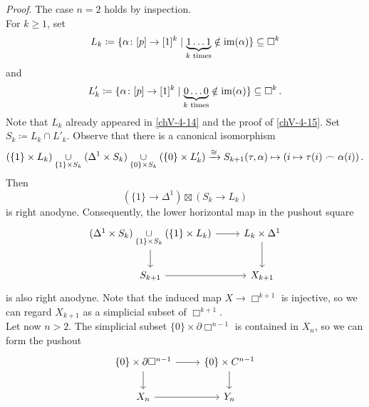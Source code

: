         \emph{Proof}. The case $n = 2$ holds by inspection.\\
        For $k \geq 1$, set
        \begin{equation*}
            L_k \coloneq \{ \alpha \colon [p] \to [1]^k \mid \underbrace{1 \ldots 1}_{k \text{ times}} \notin \operatorname{im}(\alpha)\} \subseteq \Box^k
        \end{equation*}
        and
        \begin{equation*}
            L'_k \coloneq \{ \alpha \colon [p] \to [1]^k \mid \underbrace{0 \ldots 0}_{k \text{ times}} \notin \operatorname{im}(\alpha)\} \subseteq \Box^k \,.
        \end{equation*}
        Note that $L_k$ already appeared in \ref{chV-4-14} and the proof of \ref{chV-4-15}. Set $S_k \coloneq L_k \cap L'_k$. Observe that there is a canonical isomorphism
        \begin{equation*}
            (\{1\} \times L_k) \underset{\{1\} \times S_k}{\cup} (\Delta^1 \times S_k) \underset{\{0\} \times S_k}{\cup} (\{0\} \times L'_k) \xrightarrow{\cong} S_{k+1} \\
            (\tau, \alpha) \mapsto (i \mapsto \tau(i) \frown \alpha(i)) \,.
        \end{equation*}
        Then
        \begin{equation*}
            (\{1\} \to \Delta^1) \boxtimes (S_k \to L_k)
        \end{equation*}
        is right anodyne. Consequently, the lower horizontal map in the pushout square
        \begin{equation*}
            \begin{tikzcd}
                (\Delta^1 \times S_k) \underset{\{1\} \times S_k}{\cup} (\{1\} \times L_k) \arrow[d] \arrow[r] & L_k \times \Delta^1 \arrow[d] \\
                S_{k+1} \arrow[r] & X_{k+1}
            \end{tikzcd}
        \end{equation*}
        is also right anodyne. Note that the induced map $X \to \Box^{k+1}$ is injective, so we can regard $X_{k+1}$ as a simplicial subset of $\Box^{k+1}$. \\
        Let now $n > 2$. The simplicial subset $\{0\} \times \partial \Box^{n-1}$ is contained in $X_n$, so we can form the pushout
        \begin{equation*}
            \begin{tikzcd}
                \{0\} \times \partial \Box^{n-1} \arrow[d] \arrow[r] & \{0\} \times C^{n-1} \arrow[d] \\
                X_n \arrow[r] & Y_n
            \end{tikzcd}
        \end{equation*}
